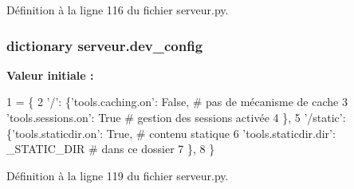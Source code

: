 Définition à la ligne 116 du fichier serveur.\-py.

\hypertarget{namespaceserveur_ab0d89e80607d8c3e353fbdec568c25c1}{
\subsubsection[{dev\-\_\-config}]{\setlength{\rightskip}{0pt plus 5cm}dictionary serveur.\-dev\-\_\-config}}\label{namespaceserveur_ab0d89e80607d8c3e353fbdec568c25c1}
{\bfseries Valeur initiale \-:}
\begin{DoxyCode}
1 = \{
2     \textcolor{stringliteral}{'/'}:       \{\textcolor{stringliteral}{'tools.caching.on'}: \textcolor{keyword}{False}, \textcolor{comment}{# pas de mécanisme de cache}
3                 \textcolor{stringliteral}{'tools.sessions.on'}: \textcolor{keyword}{True}  \textcolor{comment}{# gestion des sessions activée}
4                 \},
5     \textcolor{stringliteral}{'/static'}: \{\textcolor{stringliteral}{'tools.staticdir.on'}: \textcolor{keyword}{True},        \textcolor{comment}{# contenu statique}
6                 \textcolor{stringliteral}{'tools.staticdir.dir'}: \_STATIC\_DIR \textcolor{comment}{# dans ce dossier}
7                 \},
8     \}
\end{DoxyCode}


Définition à la ligne 119 du fichier serveur.\-py.

